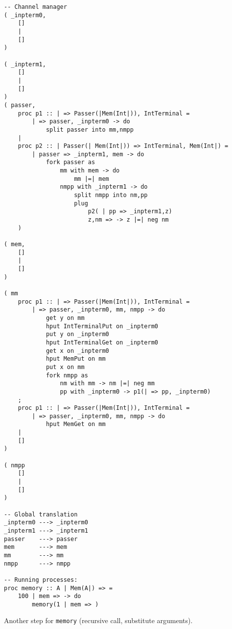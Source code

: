 \documentclass{article}
\theoremstyle{plain}%
\theoremstyle{definition}
\theoremstyle{remark}
\begin{document}
\begin{verbatim}
-- Channel manager
( _inpterm0,  
    []
    |
    []
)

( _inpterm1,  
    []
    |
    []
)
( passer,
    proc p1 :: | => Passer(|Mem(Int|)), IntTerminal = 
        | => passer, _inpterm0 -> do
            split passer into mm,nmpp 
    |
    proc p2 :: | Passer(| Mem(Int|)) => IntTerminal, Mem(Int|) =
        | passer => _inpterm1, mem -> do
            fork passer as
                mm with mem -> do
                    mm |=| mem
                nmpp with _inpterm1 -> do
                    split nmpp into nm,pp
                    plug
                        p2( | pp => _inpterm1,z)
                        z,nm => -> z |=| neg nm
    )

( mem,
    []
    |
    []
)

( mm
    proc p1 :: | => Passer(|Mem(Int|)), IntTerminal = 
        | => passer, _inpterm0, mm, nmpp -> do
            get y on mm
            hput IntTerminalPut on _inpterm0
            put y on _inpterm0
            hput IntTerminalGet on _inpterm0
            get x on _inpterm0
            hput MemPut on mm
            put x on mm
            fork nmpp as
                nm with mm -> nm |=| neg mm
                pp with _inpterm0 -> p1(| => pp, _inpterm0)
    ;
    proc p1 :: | => Passer(|Mem(Int|)), IntTerminal = 
        | => passer, _inpterm0, mm, nmpp -> do
            hput MemGet on mm 
    |
    []
)

( nmpp
    []
    |
    []
)

-- Global translation
_inpterm0 ---> _inpterm0 
_inpterm1 ---> _inpterm1 
passer    ---> passer 
mem       ---> mem
mm        ---> mm
nmpp      ---> nmpp

-- Running processes:
proc memory :: A | Mem(A|) => =
    100 | mem => -> do
        memory(1 | mem => )
\end{verbatim}
Another step for \verb|memory| (recursive call, substitute arguments).
\end{document}
